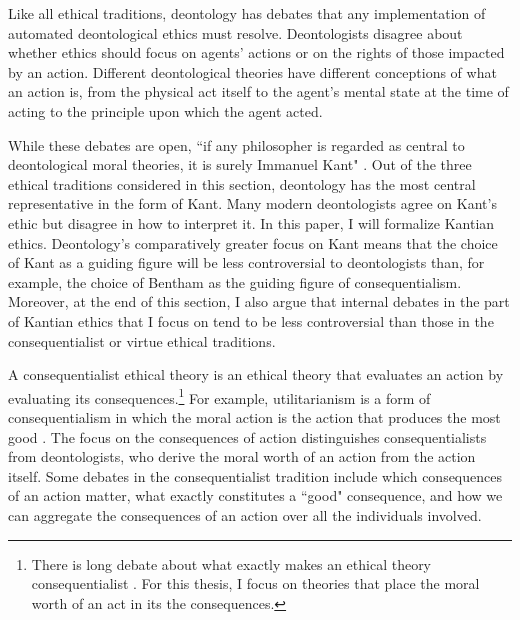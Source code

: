 \begin{isabellebody}
\begin{isamarkuptext}
Like all ethical traditions, deontology has debates that any implementation of automated deontological
ethics must resolve. Deontologists disagree about whether ethics should focus on agents' actions or 
on the rights of those impacted by an action. Different deontological theories have different conceptions 
of what an action is, from the physical act itself to the agent's mental state at the time of acting 
to the principle upon which the agent acted. 

While these debates are open, ``if any philosopher is regarded as central
to deontological moral theories, it is surely Immanuel Kant" \citep{sepdeont}. Out of the three ethical
traditions considered in this section, deontology has the most central representative in the form of 
Kant. Many modern deontologists agree on Kant's ethic but disagree in how to interpret it. In this paper, I will 
formalize Kantian ethics. Deontology's comparatively greater focus on Kant means that the choice of 
Kant as a guiding figure will be less controversial to deontologists than, for example, the choice of Bentham
as the guiding figure of consequentialism. Moreover, at the end of this section, I also argue that 
internal debates in the part of Kantian ethics that I focus on tend to be less controversial than those
in the consequentialist or virtue ethical traditions.%
\end{isamarkuptext}\isamarkuptrue%
%
\isadelimdocument
%
\endisadelimdocument
%
\isatagdocument
%
\isamarkuptrue%
%
\endisatagdocument
{\isafolddocument}%
%
\isadelimdocument
%
\endisadelimdocument
%
\begin{isamarkuptext}%
A consequentialist ethical theory is an ethical theory that evaluates an 
action by evaluating its consequences.\footnote{There is long debate about what exactly makes an ethical theory consequentialist \citep{consequentialismsep}. 
For this thesis, I focus on theories that place the moral worth of an act in its the consequences.} For example, 
utilitarianism is a form of consequentialism in which the moral action 
is the action that produces the most good \citep{utilsep}. The focus
on the consequences of action distinguishes consequentialists from deontologists, who derive the moral worth
of an action from the action itself. Some debates in the consequentialist tradition include 
which consequences of an action matter, what exactly constitutes a ``good" consequence, and how we can 
aggregate the consequences of an action over all the individuals involved.%
\end{isamarkuptext}\isamarkuptrue%

\end{isabellebody}

